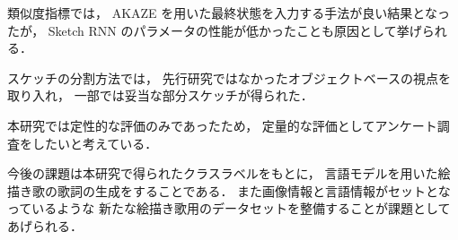 \documentclass[twocolumn]{jarticle}     %
\begin{document}
類似度指標では，
AKAZE を用いた最終状態を入力する手法が良い結果となったが，
Sketch RNN のパラメータの性能が低かったことも原因として挙げられる．

スケッチの分割方法では，
先行研究ではなかったオブジェクトベースの視点を取り入れ，
一部では妥当な部分スケッチが得られた．

本研究では定性的な評価のみであったため，
定量的な評価としてアンケート調査をしたいと考えている．


今後の課題は本研究で得られたクラスラベルをもとに，
言語モデルを用いた絵描き歌の歌詞の生成をすることである．
また画像情報と言語情報がセットとなっているような
新たな絵描き歌用のデータセットを整備することが課題としてあげられる．

%
%
%



\end{document}
